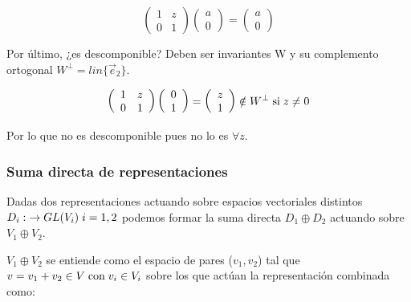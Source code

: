 \documentclass{article}
\begin{document}
    $$\left ( \begin{array}{cc}
        1 & z \\
        0 & 1
    \end{array}\right) \left( \begin{array}{c}
         a  \\
         0
    \end{array}\right)=  \left( \begin{array}{c}
         a  \\
         0
    \end{array}\right)$$

    \smallskip
    Por último, ¿es descomponible? Deben ser invariantes W y su complemento ortogonal $W^\bot =lin \lbrace \Vec{e}_2 \rbrace$.

    $$\left ( \begin{array}{cc}
        1 & z \\
        0 & 1
    \end{array}\right) \left( \begin{array}{c}
         0  \\
         1
    \end{array}\right)=  \left( \begin{array}{c}
         z  \\
         1
    \end{array}\right) \notin W^\bot \hspace{0.1cm} \text{si} \hspace{0.1cm} z\neq 0$$


    Por lo que no es descomponible pues no lo es $\forall z$.

    \newpage
    \subsubsection{Suma directa de representaciones}

    Dadas dos representaciones actuando sobre espacios vectoriales distintos $D_i: \hspace{0.1cm} \to GL(V_i)\hspace{0.1cm} i=1,2$ podemos formar la suma directa $D_1\oplus D_2$ actuando sobre $V_1 \oplus V_2$.

    $V_1 \oplus V_2$ se entiende como el espacio de pares ($v_1,v_2$) tal que $v=v_1+v_2 \in V \hspace{0.1cm} \text{con} \hspace{0.1cm} v_i\in V_i$ sobre los que actúan la representación combinada como:
\end{document}
